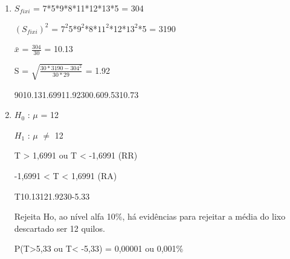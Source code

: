 
\begin{question}
    
    \begin{enumerate}[label={\textbf{\alph*)}}]

        \item
   
            $S_{fixi}$ = 7*5*9*8*11*12*13*5 = 304

            $(S_{fixi})^2$ = $7^2$5*$9^2$*8*$11^2$*12*$13^2$*5 = 3190

            $\bar{x}$ = $\frac{304}{30}$ = 10.13 

            S = $\sqrt{\frac{30*3190-304^2}{30*29}}$ = 1.92

            \begin{formula2}
                {90}{10.13}{1.6991}{1.92}{30}{0.60}{9.53}{10.73}
            \end{formula2}

        \item 

            $H_0$ : $\mu$ = 12

            $H_1$ : $\mu$ $\neq$ 12 
        
            T > 1,6991 ou T < -1,6991 (RR)

            -1,6991 < T < 1,6991 (RA)

            \begin{formula7}
                {T}{10.13}{12}{1.92}{30}{-5.33}
            \end{formula7}

            Rejeita Ho, ao nível alfa 10\%, há evidências para rejeitar
            a média do lixo descartado ser 12 quilos. 

            P(T>5,33 ou T< -5,33) = 0,00001 ou 0,001\%

    \end{enumerate}
\end{question}